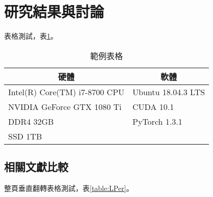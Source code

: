 
\section{研究結果與討論}

表格測試，表\ref{table:hardware_software}。

\begin{table}[htbp]
    \centering
    \caption{範例表格}
    \label{table:hardware_software}
    \begin{tabular}{p{}p{}}
        \hline
        \multicolumn{1}{c}{\textbf{硬體}} & \multicolumn{1}{c}{\textbf{軟體}} \\ \hline
        Intel(R) Core(TM) i7-8700 CPU      & Ubuntu 18.04.3 LTS               \\
        NVIDIA GeForce GTX 1080 Ti         & CUDA 10.1                        \\
        DDR4 32GB                          & PyTorch 1.3.1                    \\
        SSD 1TB                            &                                  \\ \hline
    \end{tabular}
\end{table}

\subsection{相關文獻比較}

整頁垂直翻轉表格測試，表\ref{table:LPer}。

